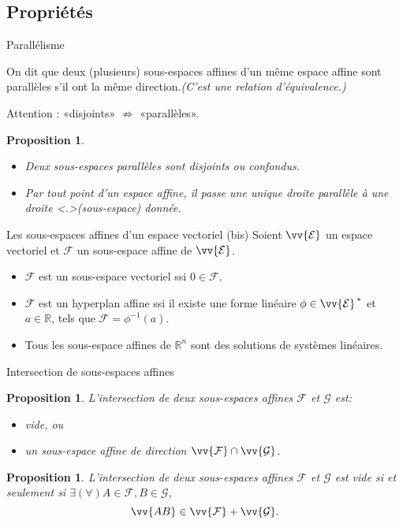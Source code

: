 \documentclass[aspectratio=1610 %
]{beamer}
\newcommand{\myemph}[1]{\textcolor{green!70!black}{\emph{#1}}}
\newtheorem{proposition}[theorem]{Proposition}
\let\ens\mathcal
\begin{document}
\subsection{Propriétés}
  \begin{frame}{Parallélisme}
    \begin{definition}
      On dit que deux (plusieurs) sous-espaces affines d'un même espace affine sont
      \alert{parallèles} s'il ont la même direction.\pause\myemph{(C'est une relation d'équivalence.)}
    \end{definition}\pause
    Attention : «disjoints» $\not\Rightarrow$ «parallèles».\pause
    \begin{proposition}
      \begin{itemize}[<+->]
        \item Deux sous-espaces parallèles sont disjoints ou confondus.
        \item Par tout point d'un espace affine, il passe une unique droite \uncover<+>{(sous-espace)} parallèle à une droite  donnée.
      \end{itemize}
    \end{proposition}
  \end{frame}
  \begin{frame}{Les sous-espaces affines d'un espace vectoriel (bis)}
    Soient $\vv{\ens{E}}$ un espace vectoriel et $\ens{F}$ un sous-espace affine de $\vv{\ens{E}}$.
    \begin{itemize}[<+(1)->]
      \item $\ens{F}$ est un sous-espace vectoriel ssi $0 \in \ens{F}$.
      \item $\ens{F}$ est un hyperplan affine ssi il existe une forme linéaire $\phi\in\vv{\ens{E}}^{\,*}$ et $a \in \mathbb{R}$, tels que $\ens{F}=\phi^{-1}(a)$.
      \item Tous les sous-espace affines de $\mathbb{R}^{n}$ sont des solutions de systèmes linéaires.
    \end{itemize}
  \end{frame}
  \begin{frame}{Intersection de sous-espaces affines}
    \begin{proposition}
      L'intersection de deux sous-espaces affines $\ens{F}$ et $\ens{G}$ est:
      \begin{itemize}\pause
          \item vide\pause, ou
          \item un sous-espace affine de direction $\vv{\ens{F}}\cap\vv{\ens{G}}$.
        \end{itemize}
    \end{proposition}\pause
    \begin{proposition}
      L'intersection de deux sous-espaces affines $\ens{F}$ et $\ens{G}$ est vide si et seulement si $\exists(\forall) A \in \ens{F}, B \in \ens{G}$,
      $$
        \vv{AB} \in \vv{\ens{F}}+\vv{\ens{G}}.
      $$
    \end{proposition}
  \end{frame}
\end{document}
